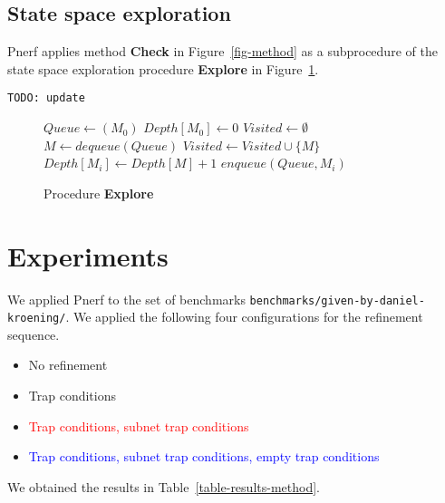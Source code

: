 \documentclass{article}
\begin{document}
\subsection{State space exploration}

Pnerf applies method {\bf Check} in Figure~\ref{fig-method} as a subprocedure of
the state space exploration procedure {\bf Explore} in
Figure~\ref{fig-procedure-explore}.

\verb?TODO: update?

\begin{figure}[h]
\begin{algorithmic}[1]
  \State $Queue \gets ( M_0 )$
  \State $Depth[M_0] \gets 0$
  \State $Visited \gets \emptyset$
    \State $M \gets dequeue(Queue)$
    \State $Visited \gets Visited \cup \{ M \}$
      \State \Return {}
    \EndIf
      \State \Return {}
    \EndIf
          \State $Depth[M_i] \gets Depth[M] + 1$
          \State $enqueue(Queue, M_i)$
        \EndIf
      \EndFor
    \EndIf
  \EndWhile
\EndProcedure
\end{algorithmic}
\caption{Procedure {\bf Explore}}
\label{fig-procedure-explore}
\end{figure}


\section{Experiments}

We applied Pnerf to the set of benchmarks
\verb?benchmarks/given-by-daniel-kroening/?. We applied the following
four configurations for the refinement sequence.
\begin{itemize}
  \item No refinement
  \item \textcolor{OliveGreen}{Trap conditions}
  \item \textcolor{red}{Trap conditions, subnet trap conditions}
  \item \textcolor{blue}{Trap conditions, subnet trap conditions, empty trap conditions}
\end{itemize}
We obtained the results in Table~\ref{table-results-method}.
\end{document}
